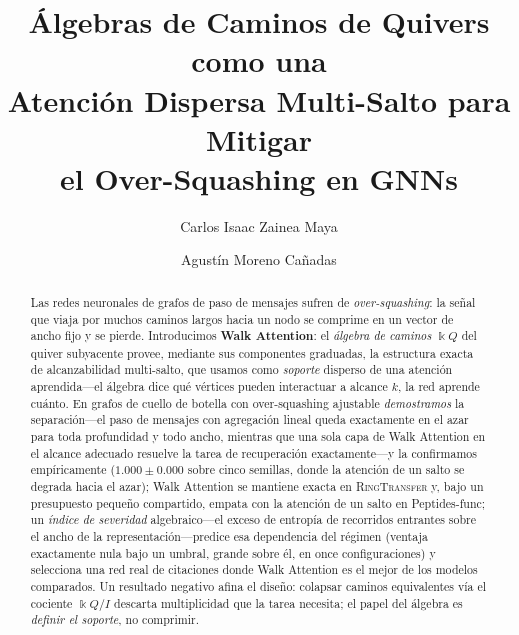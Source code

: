 \documentclass[runningheads]{llncs}
\newcommand{\kk}{\Bbbk}
\newcommand{\kQ}{\kk Q}
\begin{document}
\title{Álgebras de Caminos de Quivers como una\\ Atención Dispersa Multi-Salto para Mitigar\\ el Over-Squashing en GNNs}

\author{Carlos Isaac Zainea Maya \and
Agustín Moreno Cañadas}

\maketitle

\begin{abstract}
Las redes neuronales de grafos de paso de mensajes sufren de
\emph{over-squashing}: la señal que viaja por muchos caminos largos hacia un
nodo se comprime en un vector de ancho fijo y se pierde. Introducimos
\textbf{Walk Attention}: el \emph{álgebra de caminos} $\kQ$ del quiver
subyacente provee, mediante sus componentes graduadas, la estructura exacta de
alcanzabilidad multi-salto, que usamos como \emph{soporte} disperso de una
atención aprendida---el álgebra dice qué vértices pueden interactuar a alcance
$k$, la red aprende cuánto. En grafos de cuello de botella con over-squashing
ajustable \emph{demostramos} la separación---el paso de mensajes con
agregación lineal queda exactamente en el azar para toda profundidad y todo
ancho, mientras que una sola capa de Walk Attention en el alcance adecuado
resuelve la tarea de recuperación exactamente---y la confirmamos
empíricamente ($1.000\pm0.000$ sobre cinco semillas, donde la atención de un
salto se degrada hacia el azar); Walk Attention se mantiene exacta en
\textsc{RingTransfer} y, bajo un presupuesto pequeño compartido, empata con la
atención de un salto en Peptides-func; un \emph{índice de severidad}
algebraico---el exceso de entropía de recorridos entrantes sobre el ancho de la
representación---predice esa dependencia del régimen (ventaja exactamente nula
bajo un umbral, grande sobre él, en once configuraciones) y selecciona una red
real de citaciones donde Walk Attention es el mejor de los modelos comparados.
Un resultado negativo afina el
diseño: colapsar caminos equivalentes vía el cociente $\kQ/I$ descarta
multiplicidad que la tarea necesita; el papel del álgebra es \emph{definir el
soporte}, no comprimir.

\end{abstract}
\end{document}
